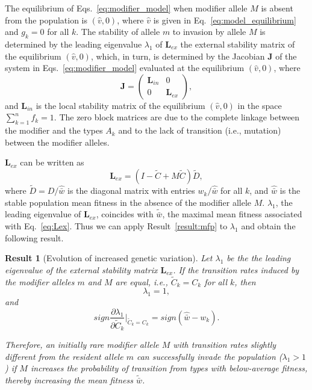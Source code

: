 \documentclass[9pt, a4paper, twocolumn]{extarticle}
\newtheorem{result}{Result}
\newcommand{\cl}{\mathbf{L}}
\newcommand{\cj}{\mathbf{J}}
\begin{document}
The equilibrium of Eqs.~\ref{eq:modifier_model} when modifier allele $M$ is absent from the population is $(\hat v,0)$, where $\hat v$ is given in Eq.~\ref{eq:model_equilibrium} and $g_k=0$ for all $k$. 
The stability of allele $m$ to invasion by allele $M$ is determined by the leading eigenvalue $\lambda_1$ of $\cl_{ex}$ the external stability matrix of the equilibrium $(\hat v,0)$, which, in turn, is determined by the Jacobian $\cj$ of the system in Eqs.~\ref{eq:modifier_model} evaluated at the equilibrium $(\hat v,0)$, where
\begin{equation}
\cj = \begin{pmatrix}\cl_{in} & 0 \\ 0 & \cl_{ex} \end{pmatrix},
\end{equation}
and $\cl_{in}$ is the local stability matrix of the equilibrium $(\hat v,0)$ in the space $\sum_{k=1}^n{f_k}=1$.
The zero block matrices are due to the complete linkage between the modifier and the types $A_k$ and to the lack of transition (i.e., mutation) between the modifier alleles.

$\cl_{ex}$ can be written as
\begin{equation}\label{eq:Lex}
\cl_{ex} = (I - \tilde{C} + M \tilde{C}) \tilde{D} ,
\end{equation}
where $\tilde{D} =D/\hat{\bar{w}}$ is the diagonal matrix with entries $w_k/\hat{\bar{w}}$ for all $k$, and $\hat{\bar{w}}$ is the stable population mean fitness in the absence of the modifier allele $M$.
$\lambda_1$, the leading eigenvalue of $\cl_{ex}$, coincides with $\tilde{\bar{w}}$, the maximal mean fitness associated with Eq.~\ref{eq:Lex}.
Thus we can apply Result~\ref{result:mfp} to $\lambda_1$ and obtain the following result.

\begin{result}[Evolution of increased genetic variation]
Let $\lambda_1$ be the the leading eigenvalue of the external stability matrix $\cl_{ex}$.
If the transition rates induced by the modifier alleles $m$ and $M$ are equal, i.e., $\tilde{C}_k=C_k$ for all $k$, then 
\begin{equation}
\lambda_1=1,
\end{equation}
and
\begin{equation}
sign \frac{\partial \lambda_1}{\partial \tilde{C}_k}\bigg\rvert_{\tilde{C}_k = C_k} = 
sign(\hat{\bar w} - w_k).
\end{equation}

Therefore, an initially rare modifier allele $M$ with transition rates slightly different from the resident allele $m$ can successfully invade the population ($\lambda_1>1$) if $M$ increases the probability of transition from types with below-average fitness, thereby increasing the  mean fitness $\tilde{\bar w}$.
\end{result}
\end{document}
